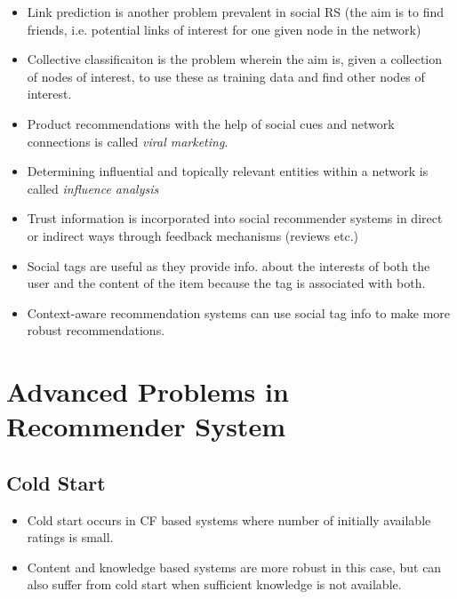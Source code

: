 \documentclass{article}
\begin{document}
\begin{itemize}
    \item Link prediction is another problem prevalent in social RS (the aim is to find friends, i.e. potential links of interest for one given node in the network)
    
    \item Collective classificaiton is the problem wherein the aim is, given a collection of nodes of interest, to use these as training data and find other nodes of interest.
    
    \item Product recommendations with the help of social cues and network connections is called \textit{viral marketing}. 
    
    \item Determining influential and topically relevant entities within a network is called \textit{influence analysis}
    
    \item Trust information is incorporated into social recommender systems in direct or indirect ways through feedback mechanisms (reviews etc.)
    
    \item Social tags are useful as they provide info. about the interests of both the user and the content of the item because the tag is associated with both.
    
    \item Context-aware recommendation systems can use social tag info to make more robust recommendations.
\end{itemize}

\section{Advanced Problems in Recommender System}
\subsection{Cold Start}
\begin{itemize}
    \item Cold start occurs in CF based systems where number of initially available ratings is small. 
    
    \item Content and knowledge based systems are more robust in this case, but can also suffer from cold start when sufficient knowledge is not available.
\end{itemize}
\end{document}
